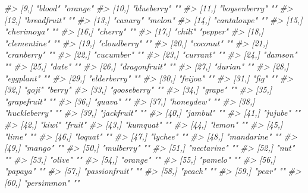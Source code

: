 \documentclass[]{book}
\newenvironment{Shaded}{\begin{snugshade}}{\end{snugshade}}
\newcommand{\CommentTok}[1]{\textcolor[rgb]{0.56,0.35,0.01}{\textit{#1}}}
\begin{document}
\begin{Shaded}
\begin{Highlighting}[]
{{\CommentTok{#>  [9,] "blood"        "orange"    }
\CommentTok{#> [10,] "blueberry"    ""          }
\CommentTok{#> [11,] "boysenberry"  ""          }
\CommentTok{#> [12,] "breadfruit"   ""          }
\CommentTok{#> [13,] "canary"       "melon"     }
\CommentTok{#> [14,] "cantaloupe"   ""          }
\CommentTok{#> [15,] "cherimoya"    ""          }
\CommentTok{#> [16,] "cherry"       ""          }
\CommentTok{#> [17,] "chili"        "pepper"    }
\CommentTok{#> [18,] "clementine"   ""          }
\CommentTok{#> [19,] "cloudberry"   ""          }
\CommentTok{#> [20,] "coconut"      ""          }
\CommentTok{#> [21,] "cranberry"    ""          }
\CommentTok{#> [22,] "cucumber"     ""          }
\CommentTok{#> [23,] "currant"      ""          }
\CommentTok{#> [24,] "damson"       ""          }
\CommentTok{#> [25,] "date"         ""          }
\CommentTok{#> [26,] "dragonfruit"  ""          }
\CommentTok{#> [27,] "durian"       ""          }
\CommentTok{#> [28,] "eggplant"     ""          }
\CommentTok{#> [29,] "elderberry"   ""          }
\CommentTok{#> [30,] "feijoa"       ""          }
\CommentTok{#> [31,] "fig"          ""          }
\CommentTok{#> [32,] "goji"         "berry"     }
\CommentTok{#> [33,] "gooseberry"   ""          }
\CommentTok{#> [34,] "grape"        ""          }
\CommentTok{#> [35,] "grapefruit"   ""          }
\CommentTok{#> [36,] "guava"        ""          }
\CommentTok{#> [37,] "honeydew"     ""          }
\CommentTok{#> [38,] "huckleberry"  ""          }
\CommentTok{#> [39,] "jackfruit"    ""          }
\CommentTok{#> [40,] "jambul"       ""          }
\CommentTok{#> [41,] "jujube"       ""          }
\CommentTok{#> [42,] "kiwi"         "fruit"     }
\CommentTok{#> [43,] "kumquat"      ""          }
\CommentTok{#> [44,] "lemon"        ""          }
\CommentTok{#> [45,] "lime"         ""          }
\CommentTok{#> [46,] "loquat"       ""          }
\CommentTok{#> [47,] "lychee"       ""          }
\CommentTok{#> [48,] "mandarine"    ""          }
\CommentTok{#> [49,] "mango"        ""          }
\CommentTok{#> [50,] "mulberry"     ""          }
\CommentTok{#> [51,] "nectarine"    ""          }
\CommentTok{#> [52,] "nut"          ""          }
\CommentTok{#> [53,] "olive"        ""          }
\CommentTok{#> [54,] "orange"       ""          }
\CommentTok{#> [55,] "pamelo"       ""          }
\CommentTok{#> [56,] "papaya"       ""          }
\CommentTok{#> [57,] "passionfruit" ""          }
\CommentTok{#> [58,] "peach"        ""          }
\CommentTok{#> [59,] "pear"         ""          }
\CommentTok{#> [60,] "persimmon"    ""          }
}}
\end{Highlighting}
\end{Shaded}
\end{document}
